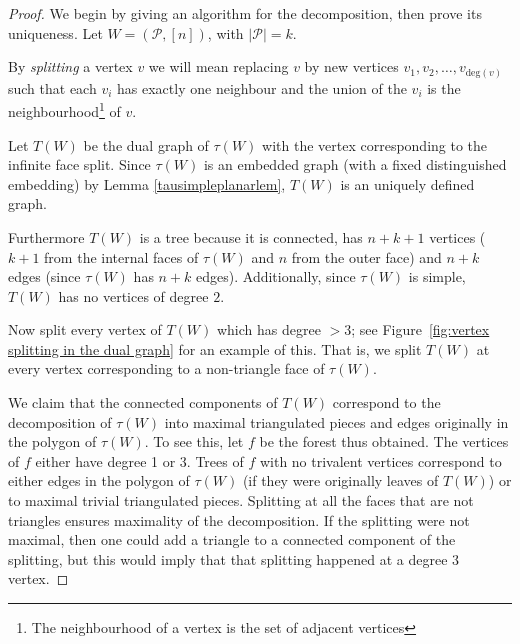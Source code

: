\documentclass[11pt]{article}
\newcommand{\hlfix}[2]{\texthl{#1}\todo{#2}}
\newcommand{\cP}{\mathcal{P}}
\theoremstyle{remark}
\theoremstyle{definition}
\begin{document}
\begin{proof}
We begin by giving an algorithm for the decomposition, then prove its uniqueness. Let $W = (\cP, [n])$, with $|\cP| = k$.

By \emph{splitting} a vertex $v$ we will mean replacing $v$ by new vertices $v_1, v_2,\ldots, v_{\text{deg}(v)}$ such that each $v_i$ has exactly one neighbour and the union of the $v_i$ is the neighbourhood\footnote{The neighbourhood of a vertex is the set of adjacent vertices} of $v$.

Let $T(W)$ be the dual graph of $\tau(W)$ with the vertex corresponding to the infinite face split.
Since $\tau(W)$ is an embedded graph (with a fixed distinguished embedding) by Lemma \ref{tausimpleplanarlem}, $T(W)$ is an uniquely defined graph.

Furthermore $T(W)$ is a tree because it is connected, has $n+k+1$ vertices ($k+1$ from the internal faces of $\tau(W)$ and $n$ from the outer face) and $n+k$ edges (since $\tau(W)$ has $n+k$ edges).  Additionally, since $\tau(W)$ is simple, $T(W)$ has no vertices of degree $2$.  


Now split every vertex of $T(W)$ which has degree $>3$; see Figure~\ref{fig:vertex splitting in the dual graph} for an example of this. That is, we split $T(W)$ at every vertex corresponding to a non-triangle face of $\tau(W)$. 

We claim that the connected components of $T(W)$ correspond to the decomposition of $\tau(W)$ into maximal triangulated pieces and edges originally in the polygon of $\tau(W)$.  To see this, let $f$ be the forest thus obtained.
The vertices of $f$ either have degree 1 or 3.
Trees of $f$ with no trivalent vertices correspond to either edges in the polygon of $\tau(W)$ (if they were originally leaves of $T(W)$) or to maximal trivial triangulated pieces.
Splitting at all the faces that are not triangles ensures maximality of the decomposition. If the splitting were not maximal, then one could add a triangle to a connected component of the splitting, but this would imply that that splitting happened at a degree $3$ vertex.


\end{proof}
\end{document}
